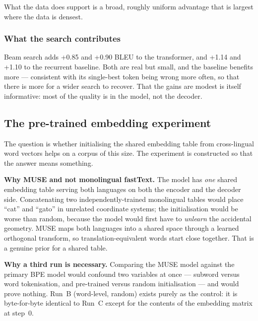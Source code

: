 \documentclass[11pt,a4paper]{article}
\begin{document}
What the data does support is a broad, roughly uniform advantage that is largest
where the data is densest.

\subsubsection*{What the search contributes}

Beam search adds +0.85 and +0.90 BLEU to the transformer, and +1.14 and +1.10 to
the recurrent baseline. Both are real but small, and the baseline benefits more
--- consistent with its single-best token being wrong more often, so that there
is more for a wider search to recover. That the gains are modest is itself
informative: most of the quality is in the model, not the decoder.

\subsection{The pre-trained embedding experiment}
\label{sec:muse}

The question is whether initialising the shared embedding table from
cross-lingual word vectors helps on a corpus of this size. The experiment is
constructed so that the answer means something.

\begin{keypoint}
\textbf{Why MUSE and not monolingual fastText.} The model has \emph{one} shared
embedding table serving both languages on both the encoder and the decoder
side. Concatenating two independently-trained monolingual tables would place
``cat'' and ``gato'' in unrelated coordinate systems; the initialisation would
be worse than random, because the model would first have to \emph{unlearn} the
accidental geometry. MUSE \cite{conneau2018} maps both languages into a shared
space through a learned orthogonal transform, so translation-equivalent words
start close together. That is a genuine prior for a shared table.
\end{keypoint}

\begin{keypoint}
\textbf{Why a third run is necessary.} Comparing the MUSE model against the
primary BPE model would confound two variables at once --- subword versus word
tokenisation, and pre-trained versus random initialisation --- and would prove
nothing. Run~B (word-level, random) exists purely as the control: it is
byte-for-byte identical to Run~C except for the contents of the embedding
matrix at step~0.
\end{keypoint}
\end{document}
